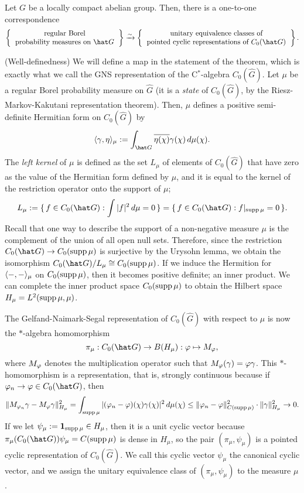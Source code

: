 \documentclass[a4paper]{article}
\begin{document}
\begin{thm}
Let $G$ be a locally compact abelian group.
Then, there is a one-to-one correspondence
\[\left\{\begin{tabular}{c}regular Borel\\probability measures on $\hat G$\end{tabular}\right\}\xrightarrow{\sim}\left\{\begin{tabular}{c}unitary equivalence classes of\\pointed cyclic representations of $C_0(\hat G)$\end{tabular}\right\}.\]
\end{thm}
\begin{pf}
(Well-definedness)
We will define a map in the statement of the theorem, which is exactly what we call the GNS representation of the C$^*$-algebra $C_0(\hat G)$.
Let $\mu$ be a regular Borel probability measure on $\hat G$ (it is a \emph{state} of $C_0(\hat G)$, by the Riesz-Markov-Kakutani representation theorem).
Then, $\mu$ defines a positive semi-definite Hermitian form on $C_0(\hat G)$ by
\[\<\gamma,\eta\>_\mu:=\int_{\hat G}\bar{\eta(\chi)}\gamma(\chi)\,d\mu(\chi).\]
The \emph{left kernel} of $\mu$ is defined as the set $L_\mu$ of elements of $C_0(\hat G)$ that have zero as the value of the Hermitian form defined by $\mu$, and it is equal to the kernel of the restriction operator onto the support of $\mu$;
\[L_\mu:=\{\,f\in C_0(\hat G):\int|f|^2\,d\mu=0\,\}=\{\,f\in C_0(\hat G):f|_{\supp\mu}=0\,\}.\]
Recall that one way to describe the support of a non-negative measure $\mu$ is the complement of the union of all open null sets.
Therefore, since the restriction $C_0(\hat G)\to C_0(\supp\mu)$ is surjective by the Urysohn lemma, we obtain the isomorphism $C_0(\hat G)/L_\mu\cong C_0(\supp\mu)$.
If we induce the Hermition for $\langle-,-\rangle_\mu$ on $C_0(\operatorname{supp}\mu)$, then it becomes positive definite; an inner product.
We can complete the inner product space $C_0(\operatorname{supp}\mu)$ to obtain the Hilbert space $H_\mu=L^2(\operatorname{supp}\mu,\mu)$.

The Gelfand-Naimark-Segal representation of $C_0(\hat G)$ with respect to $\mu$ is now the $*$-algebra homomorphism
\[\pi_\mu:C_0(\hat G)\to B(H_\mu):\f\mapsto M_\f,\]
where $M_\varphi$ denotes the multiplication operator such that $M_\varphi(\gamma)=\varphi\gamma$.
This $*$-homomorphism is a representation, that is, strongly continuous because if $\f_n\to\f\in C_0(\hat G)$, then
\[\|M_{\varphi_n}\gamma-M_\varphi\gamma\|_{H_\mu}^2=\int_{\operatorname{supp}\mu}|(\varphi_n-\varphi)(\chi)\gamma(\chi)|^2\,d\mu(\chi)\le\|\varphi_n-\varphi\|_{C(\operatorname{supp}\mu)}^2\cdot\|\gamma\|_{H_\mu}^2\to0.\]
If we let $\psi_\mu:=\mathbf{1}_{\operatorname{supp}\mu}\in H_\mu$, then it is a unit cyclic vector because $\pi_\mu(C_0(\hat G))\psi_\mu=C(\supp\mu)$ is dense in $H_\mu$, so the pair $(\pi_\mu,\psi_\mu)$ is a pointed cyclic representation of $C_0(\hat G)$.
We call this cyclic vector $\psi_\mu$ the canonical cyclic vector, and we assign the unitary equivalence class of $(\pi_\mu,\psi_\mu)$ to the measure $\mu$.


\end{pf}
\end{document}
